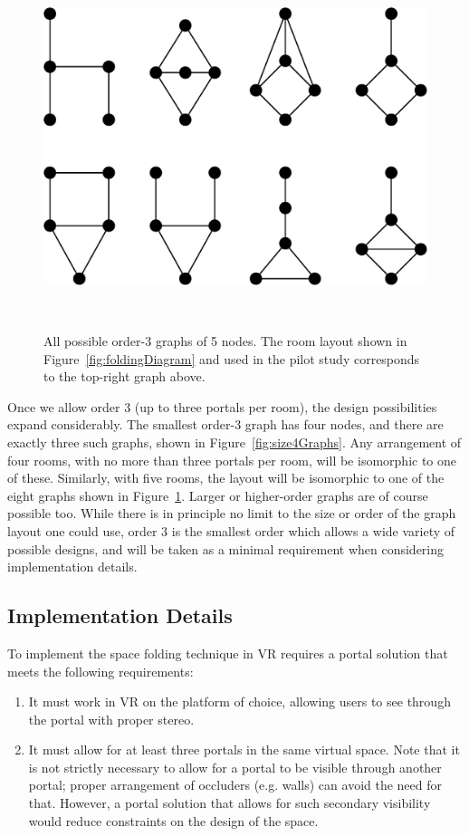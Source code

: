 \documentclass{sigchi}
\begin{document}
\begin{figure}[htb]
  \centering
  \includegraphics[width=1\columnwidth]{figures/Size5Graphs.pdf}
  \caption{All possible order-3 graphs of 5 nodes.  The room layout shown in Figure~\ref{fig:foldingDiagram} and used in the pilot study corresponds to the top-right graph above.}~\label{fig:size5Graphs}
\end{figure}

Once we allow order 3 (up to three portals per room), the design possibilities expand considerably.  The smallest order-3 graph has four nodes, and there are exactly three such graphs, shown in Figure~\ref{fig:size4Graphs}.  Any arrangement of four rooms, with no more than three portals per room, will be isomorphic to one of these.  Similarly, with five rooms, the layout will be isomorphic to one of the eight graphs shown in Figure~\ref{fig:size5Graphs}.  Larger or higher-order graphs are of course possible too.  While there is in principle no limit to the size or order of the graph layout one could use, order 3 is the smallest order which allows a wide variety of possible designs, and will be taken as a minimal requirement when considering implementation details.

\subsection{Implementation Details}

To implement the space folding technique in VR requires a portal solution that meets the following requirements:

\begin{enumerate}
\item It must work in VR on the platform of choice, allowing users to see through the portal with proper stereo.

\item It must allow for at least three portals in the same virtual space.  Note that it is not strictly necessary to allow for a portal to be visible through another portal; proper arrangement of occluders (e.g. walls) can avoid the need for that.  However, a portal solution that allows for such secondary visibility would reduce constraints on the design of the space.
\end{enumerate}
\end{document}
